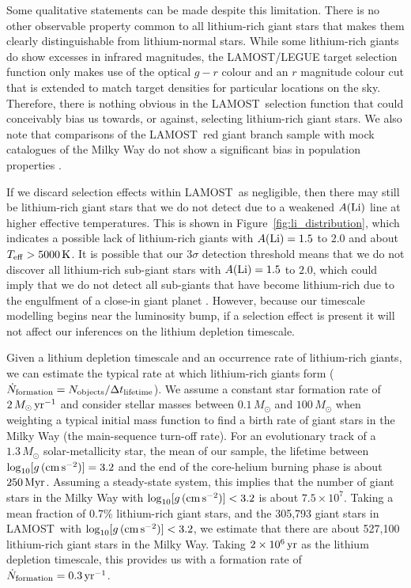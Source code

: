 \documentclass[twocolumn]{aastex62}
\newcommand\lamost{LAMOST}
\newcommand{\logg}{\log_{10}[g\,({\rm cm\,s}^{-2})]}
\begin{document}
Some qualitative statements can be made despite this limitation. There
is no other observable property common to all lithium-rich giant stars that makes
them clearly distinguishable from lithium-normal stars. While some
lithium-rich giants do show excesses in infrared magnitudes, the LAMOST/LEGUE 
target selection function \citep{Carlin_2012} only makes use of the optical $g-r$
colour and an $r$ magnitude colour cut that is extended to match target 
densities for particular locations on the sky. Therefore, there is nothing
obvious in the \lamost\ selection function that could conceivably bias us towards,
or against, selecting lithium-rich giant stars. We also note that comparisons of 
the \lamost\ red giant branch sample with mock catalogues of the Milky Way 
do not show a significant bias in population properties \citep{Liu_2017}.


If we discard selection effects within \lamost\ as negligible, then there may still
be lithium-rich giant stars that we do not detect due to a weakened $A({\rm Li})$
line at higher effective temperatures. This is shown in Figure~\ref{fig:li_distribution},
which indicates a possible lack of lithium-rich giants with $A({\rm Li}) = 1.5$ to $2.0$
and about $T_{\rm eff} > 5000\,{\rm K}$. It is possible that our $3\sigma$ detection
threshold means that we do not discover all lithium-rich sub-giant stars with $A({\rm Li}) = 1.5$ to $2.0$, which could imply that we do not detect all sub-giants that have become lithium-rich due to the engulfment of a close-in giant planet \citep{Casey_2016}. However, because our timescale modelling begins near the luminosity bump, if a selection effect is present it will not
affect our inferences on the lithium depletion timescale.


Given a lithium depletion timescale and an occurrence rate of lithium-rich giants,
we can estimate the typical rate at which lithium-rich giants form 
($\dot N_{\rm{formation}} = N_{\rm{objects}}/\Delta t_{\rm{lifetime}}$). 
We assume a constant star formation rate of $2\,M_\odot\,{\rm yr}^{-1}$ and
consider stellar masses between $0.1\,M_\odot$ and $100\,M_\odot$ when weighting
a typical initial mass function \citep{Kroupa_2001} to find a birth rate of giant stars in the Milky Way (the main-sequence turn-off rate).
For an evolutionary track \citep{Dotter_2016,Choi_2016} of a $1.3\,M_\odot$ 
solar-metallicity star, the mean of our sample, the lifetime between $\logg = 3.2$
and the end of the core-helium burning phase is about $250\,{\rm Myr}$. 
Assuming a steady-state system, this implies that the number of giant stars in the Milky Way with 
$\logg < 3.2$ is about $7.5\times10^7$. Taking a mean fraction of 0.7\% 
lithium-rich giant stars, and the 305,793 giant stars in \lamost\ with 
$\logg < 3.2$, we estimate that there are about 527,100 lithium-rich 
giant stars in the Milky Way.  Taking $2\times10^{6}\,{\rm yr}$ as the 
lithium depletion timescale, this provides us with a formation rate of 
$\dot N_{\rm formation} = 0.3\,{\rm yr}^{-1}$. 
\end{document}
